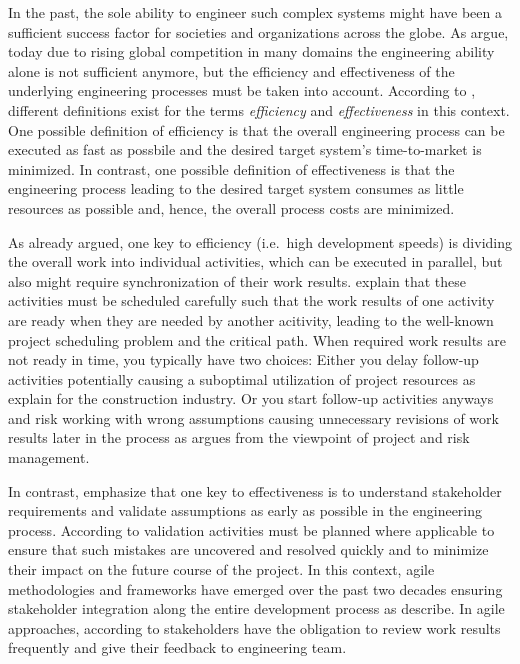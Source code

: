 \documentclass{PDS}
\begin{document}
In the past, the sole ability to engineer such complex systems might have been a sufficient success factor for societies and organizations across the globe.
As \cite{Senescu_2014} argue, today due to rising global competition in many domains the engineering ability alone is not sufficient anymore, but the efficiency and effectiveness of the underlying engineering processes must be taken into account.
According to \cite{Zidane2017}, different definitions exist for the terms \textit{efficiency} and \textit{effectiveness} in this context.
One possible definition of efficiency is that the overall engineering process can be executed as fast as possbile and the desired target system's time-to-market is minimized.
In contrast, one possible definition of effectiveness is that the engineering process leading to the desired target system consumes as little resources as possible and, hence, the overall process costs are minimized.

As \cite{Strauss_1985} already argued, one key to efficiency (i.e.\ high development speeds) is dividing the overall work into individual activities, which can be executed in parallel, but also might require synchronization of their work results.
\cite{Hartmann_2022} explain that these activities must be scheduled carefully such that the work results of one activity are ready when they are needed by another acitivity, leading to the well-known project scheduling problem and the critical path.
When required work results are not ready in time, you typically have two choices:
Either you delay follow-up activities potentially causing a suboptimal utilization of project resources as \cite{Kumaraswamy_1998} explain for the construction industry.
Or you start follow-up activities anyways and risk working with wrong assumptions causing unnecessary revisions of work results later in the process as \cite{Chapman_2006} argues from the viewpoint of project and risk management.

In contrast, \cite{Maalem_2016} emphasize that one key to effectiveness is to understand stakeholder requirements and validate assumptions as early as possible in the engineering process.
According to \cite{Mobin_2019} validation activities must be planned where applicable to ensure that such mistakes are uncovered and resolved quickly and to minimize their impact on the future course of the project.
In this context, agile methodologies and frameworks have emerged over the past two decades ensuring stakeholder integration along the entire development process as \cite{Chan_2009} describe.
In agile approaches, according to \cite{Deininger_2019} stakeholders have the obligation to review work results frequently and give their feedback to engineering team.
\end{document}

